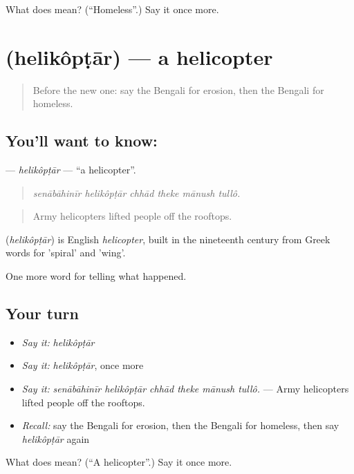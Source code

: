 \begin{tcolorbox}[breakable,colback=teal!4,colframe=teal!35!black,title={Before you move on}]
What does  mean? (\textquotedblleft{}Homeless\textquotedblright{}.) Say it once more.
\end{tcolorbox}
\section[\texorpdfstring{\bn{হেলিকপ্টার} (helikôpṭār)}{হেলিকপ্টার (helikôpṭār)}]{ (helikôpṭār) — a helicopter}

\label{lesson:BN-C290-helikoptar}



\begin{quote}
Before the new one: say the Bengali for erosion, then the Bengali for homeless.
\end{quote}

\subsection*{You'll want to know: }
\textbf{} — \emph{helikôpṭār} — \textquotedblleft{}a helicopter\textquotedblright{}.

\begin{quote}
     
\end{quote}

\begin{quote}
\emph{senābāhinīr helikôpṭār chhād theke mānush tullô.}
\end{quote}

\begin{quote}
Army helicopters lifted people off the rooftops.
\end{quote}

\begin{cousinweb}
\textbf{} (\emph{helikôpṭār}) is English \emph{helicopter}, built in the nineteenth century from Greek words for 'spiral' and 'wing'.
\end{cousinweb}

\begin{grammarlens}[title={What you've built}]
One more word for telling what happened.
\end{grammarlens}

\subsection*{Your turn}
\begin{itemize}
\raggedright
  \item \emph{Say it:} \emph{helikôpṭār}
  \item \emph{Say it:} \emph{helikôpṭār}, once more
  \item \emph{Say it:} \emph{senābāhinīr helikôpṭār chhād theke mānush tullô.} — Army helicopters lifted people off the rooftops.
  \item \emph{Recall:} say the Bengali for erosion, then the Bengali for homeless, then say \emph{helikôpṭār} again
\end{itemize}

\begin{tcolorbox}[breakable,colback=teal!4,colframe=teal!35!black,title={Before you move on}]
What does  mean? (\textquotedblleft{}A helicopter\textquotedblright{}.) Say it once more.
\end{tcolorbox}
